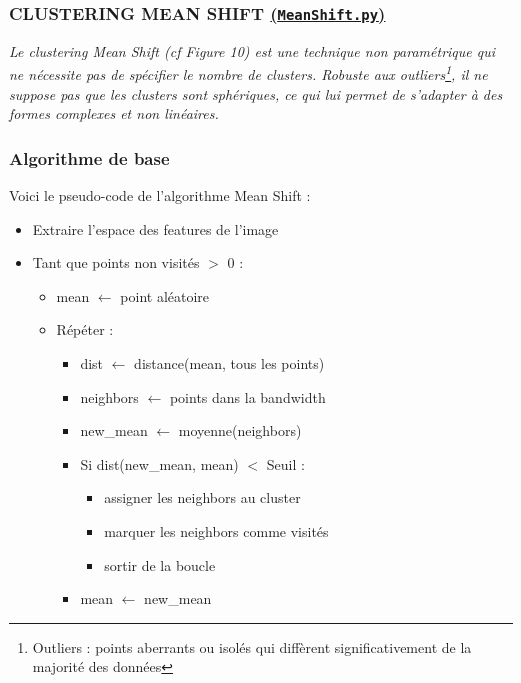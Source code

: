 \documentclass[a4paper]{article}
\begin{document}
       
        \subsubsection{CLUSTERING MEAN SHIFT \href{run:/Pistes_et_Tests/piste_meanshiftetbrainmask/MeanShift/MeanShift.py}{(\underline{\texttt{MeanShift.py}})}}

        \emph{Le clustering Mean Shift (cf Figure 10) est une technique non paramétrique qui ne nécessite pas de spécifier le nombre de clusters. Robuste aux outliers\footnote{Outliers : points aberrants ou isolés qui diffèrent significativement de la majorité des données}, il ne suppose pas que les clusters sont sphériques, ce qui lui permet de s'adapter à des formes complexes et non linéaires.}
        
        \subsubsection*{Algorithme de base}
        Voici le pseudo-code de l'algorithme Mean Shift :
        
        \begin{itemize}
            \item Extraire l'espace des features de l'image
            \item Tant que points non visités $>$ 0 :
            \begin{itemize}
                \item mean $\gets$ point aléatoire
                \item Répéter :
                \begin{itemize}
                    \item dist $\gets$ distance(mean, tous les points)
                    \item neighbors $\gets$ points dans la bandwidth
                    \item new\_mean $\gets$ moyenne(neighbors)
                    \item Si dist(new\_mean, mean) $<$ Seuil :
                    \begin{itemize}
                        \item assigner les neighbors au cluster
                        \item marquer les neighbors comme visités
                        \item sortir de la boucle
                    \end{itemize}
                    \item mean $\gets$ new\_mean
                \end{itemize}
            \end{itemize}
        \end{itemize}
        
\end{document}

